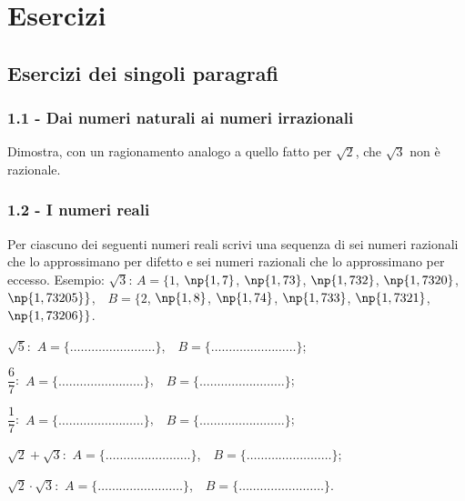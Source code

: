 \section{Esercizi}
\subsection{Esercizi dei singoli paragrafi}
\subsubsection*{1.1 - Dai numeri naturali ai numeri irrazionali}

\begin{esercizio}
\label{ese:1.1}
Dimostra, con un ragionamento analogo a quello fatto per $\sqrt 2$, che $\sqrt 3$ non è razionale.
\end{esercizio}

\subsubsection*{1.2 - I numeri reali}


\begin{esercizio}
\label{ese:1.2}
Per ciascuno dei seguenti numeri reali scrivi una sequenza di sei numeri razionali che lo approssimano per difetto e sei numeri razionali che lo approssimano per eccesso. Esempio:
$\sqrt{3}$: $A=\{1$, $\np{1,7}$, $\np{1,73}$, $\np{1,732}$, $\np{1,7320}$, $\np{1,73205}\}$,$\quad B=\{2$, $\np{1,8}$, $\np{1,74}$, $\np{1,733}$, $\np{1,7321}$, $\np{1,73206}\}$.
\begin{enumeratea}
 \item$\sqrt{5}$:\, $A=\{\ldots\ldots\ldots\ldots\ldots\ldots\ldots\ldots\}$,$\quad B=\{\ldots\ldots\ldots\ldots\ldots\ldots\ldots\ldots\}$;
 \item$\dfrac{6}{7}$:\, $A=\{\ldots\ldots\ldots\ldots\ldots\ldots\ldots\ldots\}$,$\quad B=\{\ldots\ldots\ldots\ldots\ldots\ldots\ldots\ldots\}$;
 \item$\dfrac{1}{7}$:\, $A=\{\ldots\ldots\ldots\ldots\ldots\ldots\ldots\ldots\}$,$\quad B=\{\ldots\ldots\ldots\ldots\ldots\ldots\ldots\ldots\}$;
 \item$\sqrt{2}+\sqrt{3}$:\, $A=\{\ldots\ldots\ldots\ldots\ldots\ldots\ldots\ldots\}$,$\quad B=\{\ldots\ldots\ldots\ldots\ldots\ldots\ldots\ldots\}$;
 \item$\sqrt{2}\cdot\sqrt{3}$:\, $A=\{\ldots\ldots\ldots\ldots\ldots\ldots\ldots\ldots\}$,$\quad B=\{\ldots\ldots\ldots\ldots\ldots\ldots\ldots\ldots\}$.
 \end{enumeratea}
\end{esercizio}

